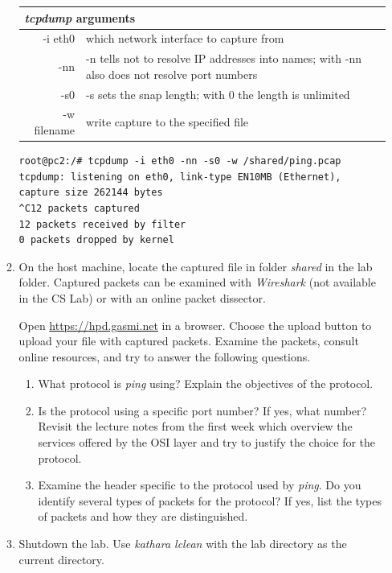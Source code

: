\documentclass[12pt]{book}
\begin{document}
\begin{enumerate}[label=\arabic*.]
\begin{enumerate}[resume*]
  \begin{tabularx}{0.9\textwidth}{r X} \toprule
    \multicolumn{2}{l}{\emph{tcpdump} arguments} \\ \midrule
    -i eth0 & which network interface to capture from \\
    -nn & -n tells not to resolve IP addresses into names; with -nn also does not resolve port numbers\\
    -s0 & -s sets the snap length; with 0 the length is unlimited \\
    -w filename & write capture to the specified file \\ \bottomrule
    \end{tabularx}

  \medskip
  \begin{lstlisting}
root@pc2:/# tcpdump -i eth0 -nn -s0 -w /shared/ping.pcap
tcpdump: listening on eth0, link-type EN10MB (Ethernet), capture size 262144 bytes
^C12 packets captured
12 packets received by filter
0 packets dropped by kernel
  \end{lstlisting}

\item\label{icmp} On the host machine, locate the captured file in folder \emph{shared} in the lab folder. Captured packets can be examined with \emph{Wireshark} (not available in the CS Lab) or with an online packet dissector.

  Open \url{https://hpd.gasmi.net} in a browser. Choose the upload button to upload your file with captured packets. Examine the packets, consult online resources, and try to answer the following questions.
  \begin{enumerate}[label=\roman*)]
  \item What protocol is \emph{ping} using? Explain the objectives of the protocol.
  \item Is the protocol using a specific port number? If yes, what number? Revisit the lecture notes from the first week which overview the services offered by the OSI layer and try to justify the choice for the protocol.
  \item Examine the header specific to the protocol used by \emph{ping}. Do you identify several types of packets for the protocol? If yes, list the types of packets and how they are distinguished.
  \end{enumerate}

\item Shutdown the lab. Use \emph{kathara lclean} with the lab directory as the current directory.


\end{enumerate}
\end{enumerate}
\end{document}
